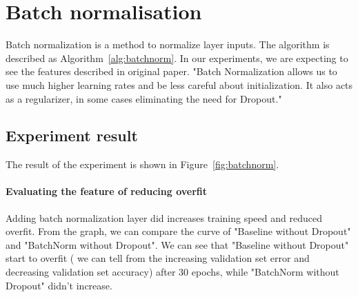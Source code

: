 \documentclass{article}
\begin{document}


\section{Batch normalisation}
Batch normalization \citep{DBLP:journals/corr/IoffeS15} is a method to normalize layer inputs.  The algorithm is described as Algorithm~\ref{alg:batchnorm}. In our experiments, we are expecting to see the features described in original paper. "Batch Normalization allows us to use much higher learning rates and be less careful about initialization. It also acts as a regularizer, in some cases eliminating the need for Dropout." \citep{DBLP:journals/corr/IoffeS15}
\subsection{Experiment result} 
The result of the experiment is shown in Figure~\ref{fig:batchnorm}.

\paragraph{Evaluating the feature of reducing overfit} Adding batch normalization layer did increases training speed and reduced overfit. From the graph, we can compare the curve of "Baseline without Dropout" and "BatchNorm without Dropout". We can see that "Baseline without Dropout" start to overfit ( we can tell from the increasing validation set error and decreasing validation set accuracy) after 30 epochs, while "BatchNorm without Dropout" didn't increase. 
\end{document}
